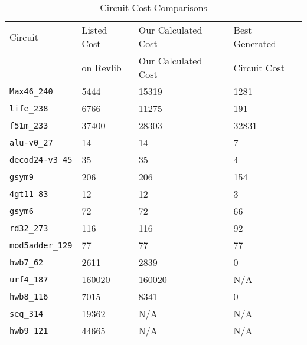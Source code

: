 \begin{table}
\begin{center}
    \begin{tabular}{l | l | l | l}
       Circuit            & Listed Cost & Our Calculated Cost & Best Generated  \\ 
                          & on Revlib   & Our Calculated Cost & Circuit Cost    \\ \hline
     \verb!Max46_240!     & 5444                  & 15319               & 1281                        \\
     \verb!life_238!      & 6766                  & 11275               & 191                         \\
     \verb!f51m_233!      & 37400                 & 28303               & 32831                       \\
     \verb!alu-v0_27!     & 14                    & 14                  & 7                           \\
     \verb!decod24-v3_45! & 35                    & 35                  & 4                           \\
     \verb!gsym9!         & 206                   & 206                 & 154                         \\
     \verb!4gt11_83!      & 12                    & 12                  & 3                           \\
     \verb!gsym6!         & 72                    & 72                  & 66                          \\
     \verb!rd32_273!      & 116                   & 116                 & 92                          \\
     \verb!mod5adder_129! & 77                    & 77                  & 77                          \\
     \verb!hwb7_62!       & 2611                  & 2839                & 0                           \\
     \verb!urf4_187!      & 160020                & 160020              & N/A                          \\
     \verb!hwb8_116!      & 7015                  & 8341                & 0                           \\
     \verb!seq_314!       & 19362                 & N/A                  & N/A                          \\
     \verb!hwb9_121!      & 44665                 & N/A                  & N/A                          \\
    \end{tabular}
\caption {Circuit Cost Comparisons}
\end{center}
\end{table}
